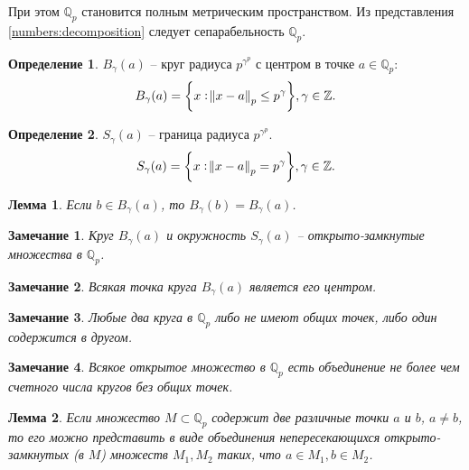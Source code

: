 \documentclass[master, och, diploma, times]{sty/SCWorks}
\theoremstyle{plain}
\newtheorem{lemma}{Лемма}[section]
\newtheorem{note}{Замечание}[section]
\theoremstyle{definition}
\newtheorem{defn}{Определение}[section]
\numberwithin{equation}{section}
\begin{document}
\noindent При этом $\mathbb {Q}_p$ становится полным метрическим пространством. Из представления \eqref{numbers:decomposition} следует сепарабельность $\mathbb {Q}_p$.  

\begin{defn}
$B_{\gamma}(a)$ -- круг радиуса $p^{\gamma^p}$ с центром в точке $a \in \mathbb {Q}_p$:
\begin{equation}
	B_\gamma(a) = \bigg\{x: \norm{x-a}_p \le p^{\gamma} \bigg\}, \gamma \in \mathbb {Z}.
\end{equation}
\end{defn}

\begin{defn}
$S_{\gamma}(a)$ -- граница радиуса $p^{\gamma^p}$.
\begin{equation}
	S_\gamma(a) = \bigg\{x: \norm{x-a}_p = p^{\gamma} \bigg\}, \gamma \in \mathbb {Z}.
\end{equation}
\end{defn}

\begin{lemma}
Если $b \in B_{\gamma}(a)$, то $B_{\gamma}(b)=B_{\gamma}(a)$.
\end{lemma}

\begin{note}
Круг $B_{\gamma}(a)$ и окружность $S_{\gamma}(a)$ -- открыто-замкнутые множества в $\mathbb {Q}_p$.
\end{note}

\begin{note}
Всякая точка круга $B_{\gamma}(a)$ является его центром.
\end{note}

\begin{note}
Любые два круга в $\mathbb {Q}_p$ либо не имеют общих точек, либо один содержится в другом.
\end{note}

\begin{note}
Всякое открытое множество в $\mathbb {Q}_p$ есть объединение не более чем счетного числа кругов без общих точек.
\end{note}

\begin{lemma} \label{lemma:2}
Если множество $M \subset \mathbb {Q}_p$ содержит две различные точки $a$ и $b$, $a \ne b$, то его можно представить в виде объединения непересекающихся открыто-замкнутых (в $M$) множеств $M_1, M_2$ таких, что $a \in M_1, b \in M_2$\cite{bib:kozirev:2008}.
\end{lemma}
\end{document}
